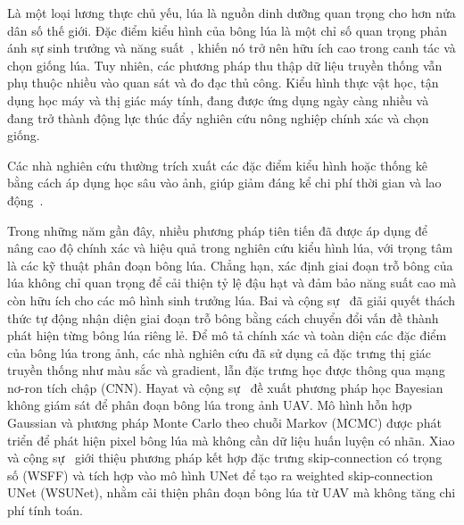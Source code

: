 \documentclass[12pt, a4paper]{article}
\begin{document}
Là một loại lương thực chủ yếu, lúa là nguồn dinh dưỡng quan trọng cho hơn nửa dân số thế
giới. Đặc điểm kiểu hình của bông lúa là một chỉ số quan trọng phản ánh sự sinh trưởng và
năng suất~\cite{chandra2020}, khiến nó trở nên hữu ích cao trong canh tác và chọn giống lúa.
Tuy nhiên, các phương pháp thu thập dữ liệu truyền thống vẫn phụ thuộc nhiều vào quan sát và
đo đạc thủ công. Kiểu hình thực vật học, tận dụng học máy và thị giác máy tính, đang được
ứng dụng ngày càng nhiều và đang trở thành động lực thúc đẩy nghiên cứu nông nghiệp chính
xác và chọn giống.

Các nhà nghiên cứu thường trích xuất các đặc điểm kiểu hình hoặc thống kê bằng cách áp dụng
học sâu vào ảnh, giúp giảm đáng kể chi phí thời gian và lao động~\cite{xiong2017}.

Trong những năm gần đây, nhiều phương pháp tiên tiến đã được áp dụng để nâng cao độ chính
xác và hiệu quả trong nghiên cứu kiểu hình lúa, với trọng tâm là các kỹ thuật phân đoạn
bông lúa. Chẳng hạn, xác định giai đoạn trỗ bông của lúa không chỉ quan trọng để cải thiện
tỷ lệ đậu hạt và đảm bảo năng suất cao mà còn hữu ích cho các mô hình sinh trưởng lúa. Bai
và cộng sự~\cite{bai2018} đã giải quyết thách thức tự động nhận diện giai đoạn trỗ bông bằng
cách chuyển đổi vấn đề thành phát hiện từng bông lúa riêng lẻ. Để mô tả chính xác và toàn
diện các đặc điểm của bông lúa trong ảnh, các nhà nghiên cứu đã sử dụng cả đặc trưng thị
giác truyền thống như màu sắc và gradient, lẫn đặc trưng học được thông qua mạng nơ-ron tích
chập (CNN). Hayat và cộng sự~\cite{hayat2020} đề xuất phương pháp học Bayesian không giám sát
để phân đoạn bông lúa trong ảnh UAV. Mô hình hỗn hợp Gaussian và phương pháp Monte Carlo theo
chuỗi Markov (MCMC) được phát triển để phát hiện pixel bông lúa mà không cần dữ liệu huấn
luyện có nhãn. Xiao và cộng sự~\cite{xiao2023} giới thiệu phương pháp kết hợp đặc trưng
skip-connection có trọng số (WSFF) và tích hợp vào mô hình UNet để tạo ra weighted
skip-connection UNet (WSUNet), nhằm cải thiện phân đoạn bông lúa từ UAV mà không tăng chi
phí tính toán.
\end{document}
